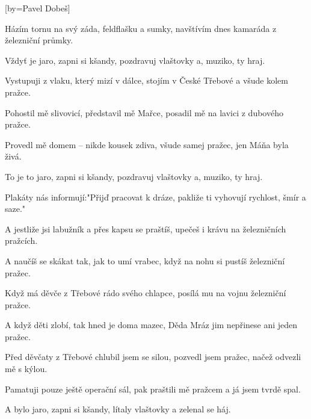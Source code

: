 [by={Pavel Dobeš}]

\beginverse{}
Házím tornu na svý záda, feldflašku a sumky,
navštívím dnes kamaráda z železniční průmky.
\endverse{}

\beginchorus{}
Vždyť je jaro, zapni si kšandy,
pozdravuj vlaštovky a, muziko, ty hraj.
\endchorus{}

\beginverse{}
Vystupuji z vlaku, který mizí v dálce,
stojím v České Třebové a všude kolem pražce.
\endverse{}

\beginverse{}
Pohostil mě slivovicí, představil mě Mařce,
posadil mě na lavici z dubového pražce.
\endverse{}

\beginverse{}
Provedl mě domem -- nikde kousek zdiva,
všude samej pražec, jen Máňa byla živá.
\endverse{}

\beginchorus{}
To je to jaro, zapni si kšandy,
pozdravuj vlaštovky a, muziko, ty hraj.
\endchorus{}

\beginverse{}
Plakáty nás informují:"Přijď pracovat k dráze,
pakliže ti vyhovují rychlost, šmír a saze."
\endverse{}

\beginverse{}
A jestliže jsi labužník a přes kapsu se praštíš,
upečeš i krávu na železničních pražcích.
\endverse{}

\beginverse{}
A naučíš se skákat tak, jak to umí vrabec,
když na nohu si pustíš železniční pražec.
\endverse{}

\beginverse{}
Když má děvče z Třebové rádo svého chlapce,
posílá mu na vojnu železniční pražce.
\endverse{}

\beginverse{}
A když děti zlobí, tak hned je doma mazec,
Děda Mráz jim nepřinese ani jeden pražec.
\endverse{}

\beginverse{}
Před děvčaty z Třebové chlubil jsem se silou,
pozvedl jsem pražec, načež odvezli mě s kýlou.
\endverse{}

\beginverse{}
Pamatuji pouze ještě operační sál,
pak praštili mě pražcem a já jsem tvrdě spal.
\endverse{}

\beginchorus{}
A bylo jaro, zapni si kšandy,
lítaly vlaštovky a zelenal se háj.
\endchorus{}

\endsong{}
